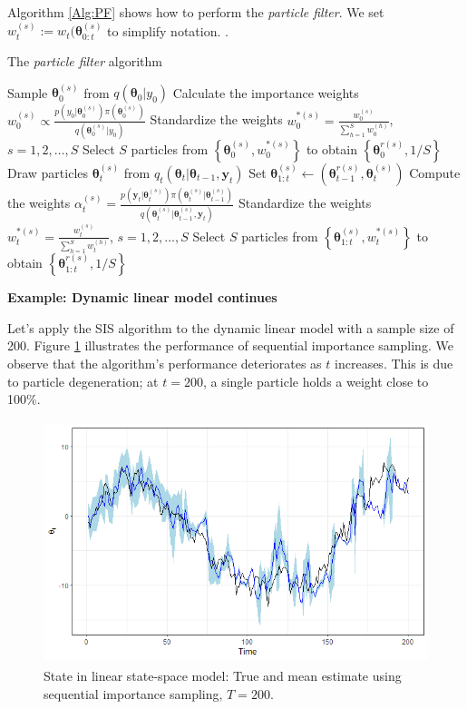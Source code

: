 Algorithm \ref{Alg:PF} shows how to perform the \textit{particle filter}. We set $w_t^{(s)}:=w_t(\bm{\theta}_{0:t}^{(s)}$ to simplify notation. \cite{doucet2009tutorial}.\\
\begin{algorithm}[h!]
	\caption{The \textit{particle filter} algorithm}\label{Alg:PF}
	\begin{algorithmic}[1]
		\State Sample $\bm{\theta}_0^{(s)}$ from $q(\bm{\theta}_0|y_0)$
		\State Calculate the importance weights $w_0^{(s)}\propto\frac{p(y_0|\bm{\theta}_0^{(s)})\pi(\bm{\theta}_0^{(s)})}{q(\bm{\theta}_0^{(s)}|y_0)}$
		\EndFor
		\State Standardize the weights $w_0^{*(s)}=\frac{w_0^{(s)}}{\sum_{h=1}^Sw_0^{(h)}}$, $s=1,2,\dots,S$
		\State Select $S$ particles from $\left\{\bm{\theta}_0^{(s)},w_0^{*(s)}\right\}$ to obtain $\left\{\bm{\theta}_0^{r(s)},1/S\right\}$  
		\State Draw particles $\bm{\theta}_t^{(s)}$ from $q_t(\bm{\theta}_t|\bm{\theta}_{t-1}, \bm{y}_t)$
		\State Set $\bm{\theta}_{1:t}^{(s)}\leftarrow (\bm{\theta}_{t-1}^{r(s)},\bm{\theta}_{t}^{(s)})$ 
		\State Compute the weights $\alpha_t^{(s)}=\frac{p(\bm{y}_{t}|\bm{\theta}_{t}^{(s)})\pi(\bm{\theta}_{t}^{(s)}|\bm{\theta}_{t-1}^{(s)})}{q(\bm{\theta}_t^{(s)}|\bm{\theta}_{t-1}^{(s)},\bm{y}_{t})}$		
		\EndFor
		\State Standardize the weights $w_t^{*(s)}=\frac{w_t^{(s)}}{\sum_{h=1}^Sw_t^{(h)}}$, $s=1,2,\dots,S$ 
		\State Select $S$ particles from $\left\{\bm{\theta}_{1:t}^{(s)},w_t^{*(s)}\right\}$ to obtain $\left\{\bm{\theta}_{1:t}^{r(s)},1/S\right\}$  
		\EndFor
	\end{algorithmic} 
\end{algorithm}

\textbf{Example: Dynamic linear model continues}

Let's apply the SIS algorithm to the dynamic linear model with a sample size of 200. Figure \ref{fig59} illustrates the performance of sequential importance sampling. We observe that the algorithm's performance deteriorates as $t$ increases. This is due to particle degeneration; at $t=200$, a single particle holds a weight close to 100\%.

\begin{figure}[!h]
	\includegraphics[width=340pt, height=200pt]{Chapters/chapter5/figures/SIS200.png}
	\caption[List of figure caption goes here]{State in linear state-space model: True and mean estimate using sequential importance sampling, $T=200$.}\label{fig59}
\end{figure} 

